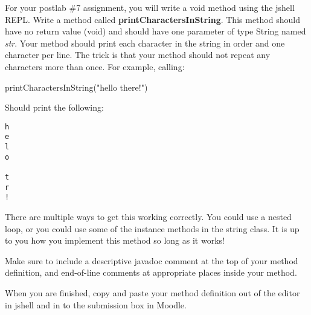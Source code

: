 For your postlab \#7 assignment, you will write a void method using the jshell REPL. Write a method called \textbf{printCharactersInString}. This method should have no return value (void) and should have one parameter of type String named \textit{str}. Your method should print each character in the string in order and one character per line. The trick is that your method should not repeat any characters more than once. For example, calling:

\begin{code}
printCharactersInString("hello there!")
\end{code}

Should print the following:

\begin{verbatim}
h
e
l
o
 
t
r
!
\end{verbatim}

There are multiple ways to get this working correctly. You could use a nested loop, or you could use some of the instance methods in the string class. It is up to you how you implement this method so long as it works!

Make sure to include a descriptive javadoc comment at the top of your method definition, and end-of-line comments at appropriate places inside your method. 

When you are finished, copy and paste your method definition out of the editor in jshell and in to the submission box in Moodle. 
